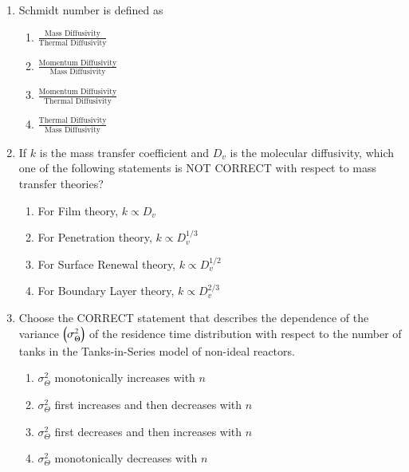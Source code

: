\documentclass[journal,12pt,onecolumn]{IEEEtran}
\theoremstyle{remark}
\begin{document}
\begin{enumerate}
		\item Schmidt number is defined as
		
		\hfill{}
		
		\begin{multicols}{2}
			\begin{enumerate}
				\item $\frac{\text{Mass Diffusivity}}{\text{Thermal Diffusivity}}$
				\item $\frac{\text{Momentum Diffusivity}}{\text{Mass Diffusivity}}$
				\item $\frac{\text{Momentum Diffusivity}}{\text{Thermal Diffusivity}}$
				\item $\frac{\text{Thermal Diffusivity}}{\text{Mass Diffusivity}}$
			\end{enumerate}
		\end{multicols}
		
		\item If $k$ is the mass transfer coefficient and $D_v$ is the molecular diffusivity, which one of the following statements is NOT CORRECT with respect to mass transfer theories?
		
		\hfill{}
		
		\begin{enumerate}
			\item For Film theory, $k \propto D_v$
			\item For Penetration theory, $k \propto D_v^{1/3}$
			\item For Surface Renewal theory, $k \propto D_v^{1/2}$
			\item For Boundary Layer theory, $k \propto D_v^{2/3}$
		\end{enumerate}
		
		\item Choose the CORRECT statement that describes the dependence of the variance $\left(\sigma_{\Theta}^2\right)$ of the residence time distribution  with respect to the number of tanks  in the Tanks-in-Series model of non-ideal reactors.
		
		\hfill{}
		
		\begin{enumerate}
			\item $\sigma_{\Theta}^2$ monotonically increases with $n$
			\item $\sigma_{\Theta}^2$ first increases and then decreases with $n$
			\item $\sigma_{\Theta}^2$ first decreases and then increases with $n$
			\item $\sigma_{\Theta}^2$ monotonically decreases with $n$
		\end{enumerate}
		

\end{enumerate}
\end{document}
